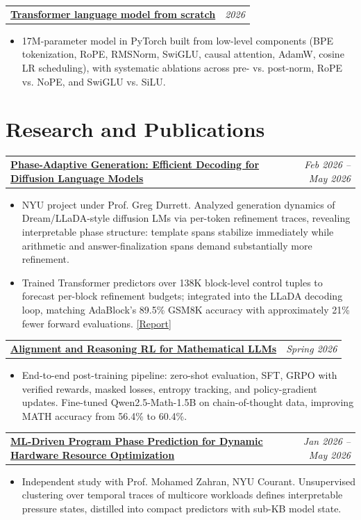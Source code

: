 \documentclass[10pt,letterpaper]{article}
\makeatletter
\newcommand{\project}[2]{%
  \begin{tabularx}{\textwidth}{@{}Xr@{}}
    \textbf{#1} & \textit{#2}
  \end{tabularx}\vspace{-0.25em}
}
\makeatother
\begin{document}
\vspace{0.6em}
\project{\href{https://github.com/k-keshav-k/Large-Language-Models-from-Scratch}{Transformer language model from scratch}}{2026}
\begin{itemize}
  \item 17M-parameter model in PyTorch built from low-level components (BPE tokenization, RoPE, RMSNorm, SwiGLU, causal attention, AdamW, cosine LR scheduling), with systematic ablations across pre- vs. post-norm, RoPE vs. NoPE, and SwiGLU vs. SiLU.
\end{itemize}

\newpage
\section{Research and Publications}

\project{\href{https://github.com/k-keshav-k/Phase-Assisted-Generation}{Phase-Adaptive Generation: Efficient Decoding for Diffusion Language Models}}{Feb 2026 -- May 2026}
\begin{itemize}
  \item NYU project under Prof. Greg Durrett. Analyzed generation dynamics of Dream/LLaDA-style diffusion LMs via per-token refinement traces, revealing interpretable phase structure: template spans stabilize immediately while arithmetic and answer-finalization spans demand substantially more refinement.
  \item Trained Transformer predictors over 138K block-level control tuples to forecast per-block refinement budgets; integrated into the LLaDA decoding loop, matching AdaBlock's 89.5\% GSM8K accuracy with approximately 21\% fewer forward evaluations. \href{https://github.com/k-keshav-k/Phase-Assisted-Generation/blob/main/writeup/final_report.pdf}{[Report]}
\end{itemize}

\vspace{0.75em}
\project{\href{https://github.com/k-keshav-k/Alignment-and-Reasoning-RL}{Alignment and Reasoning RL for Mathematical LLMs}}{Spring 2026}
\begin{itemize}
  \item End-to-end post-training pipeline: zero-shot evaluation, SFT, GRPO with verified rewards, masked losses, entropy tracking, and policy-gradient updates. Fine-tuned Qwen2.5-Math-1.5B on chain-of-thought data, improving MATH accuracy from 56.4\% to 60.4\%.
\end{itemize}

\vspace{0.75em}
\project{\href{https://github.com/k-keshav-k/ML-based-hardware-optimization-using-Phases}{ML-Driven Program Phase Prediction for Dynamic Hardware Resource Optimization}}{Jan 2026 -- May 2026}
\begin{itemize}
  \item Independent study with Prof. Mohamed Zahran, NYU Courant. Unsupervised clustering over temporal traces of multicore workloads defines interpretable pressure states, distilled into compact predictors with sub-KB model state.
\end{itemize}
\end{document}

